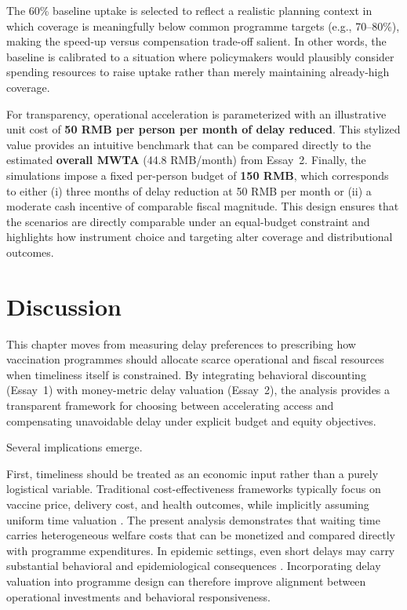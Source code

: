 \documentclass[doublespacing]{utdthesis}
\let\cite=\citep
\begin{document}
The 60\% baseline uptake is selected to reflect a realistic planning context in which coverage is meaningfully below common programme targets (e.g., 70--80\%), making the speed-up versus compensation trade-off salient. In other words, the baseline is calibrated to a situation where policymakers would plausibly consider spending resources to raise uptake rather than merely maintaining already-high coverage.

For transparency, operational acceleration is parameterized with an illustrative unit cost of \textbf{50 RMB per person per month of delay reduced}. This stylized value provides an intuitive benchmark that can be compared directly to the estimated \textbf{overall MWTA} (44.8 RMB/month) from Essay~2. Finally, the simulations impose a fixed per-person budget of \textbf{150 RMB}, which corresponds to either (i) three months of delay reduction at 50 RMB per month or (ii) a moderate cash incentive of comparable fiscal magnitude. This design ensures that the scenarios are directly comparable under an equal-budget constraint and highlights how instrument choice and targeting alter coverage and distributional outcomes.

\clearpage



\section{Discussion}
\label{sec:essay3_discussion}

This chapter moves from measuring delay preferences to prescribing how vaccination programmes should allocate scarce operational and fiscal resources when timeliness itself is constrained. By integrating behavioral discounting (Essay~1) with money-metric delay valuation (Essay~2), the analysis provides a transparent framework for choosing between accelerating access and compensating unavoidable delay under explicit budget and equity objectives.

Several implications emerge.

First, timeliness should be treated as an economic input rather than a purely logistical variable. Traditional cost-effectiveness frameworks typically focus on vaccine price, delivery cost, and health outcomes, while implicitly assuming uniform time valuation \cite{Drummond2015}. The present analysis demonstrates that waiting time carries heterogeneous welfare costs that can be monetized and compared directly with programme expenditures. In epidemic settings, even short delays may carry substantial behavioral and epidemiological consequences \cite{Abbas2021,Castioni2024}. Incorporating delay valuation into programme design can therefore improve alignment between operational investments and behavioral responsiveness.
\end{document}
